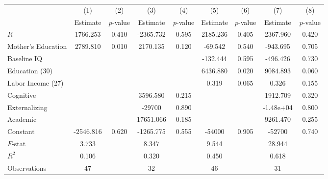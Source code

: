 \begin{tabular}{lcccccccc} \toprule
 & (1) & (2) & (3) & (4) & (5) & (6) & (7) & (8) \\ 
 & Estimate  & $p$-value  & Estimate  & $p$-value  & Estimate  & $p$-value  & Estimate  & $p$-value  \\  \midrule
$R$ &  1766.253 &     0.410 & -2365.732 &     0.595 &  2185.236 &     0.405 &  2367.960 &     0.420 \\  
Mother's Education &  2789.810 &     0.010 &  2170.135 &     0.120 &   -69.542 &     0.540 &  -943.695 &     0.705 \\  
Baseline IQ &         &         &         &         &  -132.444 &     0.595 &  -496.426 &     0.730 \\  
Education (30) &         &         &         &         &  6436.880 &     0.020 &  9084.893 &     0.060 \\  
Labor Income (27) &         &         &         &         &     0.319 &     0.065 &     0.326 &     0.155 \\  
Cognitive &         &         &  3596.580 &     0.215 &         &         &  1912.709 &     0.320 \\  
Externalizing &         &         & -29700 &     0.890 &         &         & -1.48e+04 &     0.800 \\  
Academic &         &         & 17651.066 &     0.185 &         &         &  9261.470 &     0.255 \\  
Constant & -2546.816 &     0.620 & -1265.775 &     0.555 & -54000 &     0.905 & -52700 &     0.740 \\  \midrule
$F$-stat &     3.733 &         &     8.347 &         &     9.544 &         &    28.944 &         \\  
$R^2$ &     0.106 &         &     0.320 &         &     0.450 &         &     0.618 &         \\  
Observations &    47 &         &    32 &         &    46 &         &    31 &         \\  
\bottomrule
\end{tabular}


